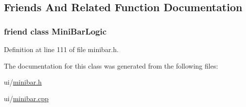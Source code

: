 \subsection{Friends And Related Function Documentation}
\hypertarget{classMiniBar_a5829e50433449ff6715750acf8485dec}{
\subsubsection[{Mini\+Bar\+Logic}]{\setlength{\rightskip}{0pt plus 5cm}friend class {\bf Mini\+Bar\+Logic}\hspace{0.3cm}{\ttfamily [friend]}}}\label{classMiniBar_a5829e50433449ff6715750acf8485dec}


Definition at line 111 of file minibar.\+h.



The documentation for this class was generated from the following files\+:\begin{DoxyCompactItemize}
\item 
ui/\hyperlink{minibar_8h}{minibar.\+h}\item 
ui/\hyperlink{minibar_8cpp}{minibar.\+cpp}\end{DoxyCompactItemize}
